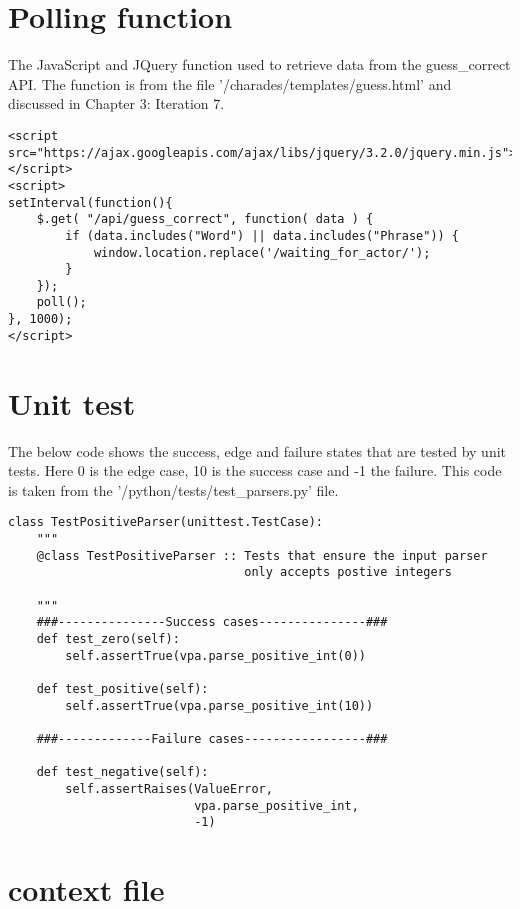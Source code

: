 \section{Polling function}

The JavaScript and JQuery function used to retrieve data from the guess\_correct API. The function is from the file '/charades/templates/guess.html' and discussed in Chapter 3: Iteration 7.

\begin{verbatim}
<script
src="https://ajax.googleapis.com/ajax/libs/jquery/3.2.0/jquery.min.js">
</script>
<script>
setInterval(function(){
    $.get( "/api/guess_correct", function( data ) {
        if (data.includes("Word") || data.includes("Phrase")) {
            window.location.replace('/waiting_for_actor/');
        }
    });
    poll();
}, 1000);
</script>
\end{verbatim}

\newpage

\section{Unit test}

The below code shows the success, edge and failure states that are tested by unit tests. Here 0 is the edge case, 10 is the success case and -1 the failure.
This code is taken from the '/python/tests/test\_parsers.py' file.

\begin{verbatim}
class TestPositiveParser(unittest.TestCase):
    """
    @class TestPositiveParser :: Tests that ensure the input parser
    							 only accepts postive integers
    
    """
    ###---------------Success cases---------------###
    def test_zero(self):
        self.assertTrue(vpa.parse_positive_int(0))

    def test_positive(self):
        self.assertTrue(vpa.parse_positive_int(10))

    ###-------------Failure cases-----------------###

    def test_negative(self):
        self.assertRaises(ValueError,
                          vpa.parse_positive_int,
                          -1)

\end{verbatim}

\section{context file}

